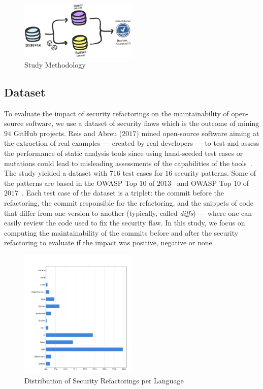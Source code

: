 \documentclass[10pt,conference]{IEEEtran}
\begin{document}
%
\begin{figure}[h]
 	\centering 	\includegraphics[width=0.5\textwidth]{figures/methodology.pdf}
 	\caption{Study Methodology}
	\label{fig:met}
\end{figure}
%
\subsection{Dataset}
%
To evaluate the impact of security refactorings on the maintainability of
open-source software, we use a dataset of security flaws which is the outcome of
mining $94$ GitHub projects. Reis and Abreu ($2017$) mined open-source
software aiming at the extraction of real examples --- created by real
developers --- to test and assess the performance of static analysis tools since
using hand-seeded test cases or mutations could lead to misleading assessments
of the capabilities of the tools~\cite{just2014mutants}. The study yielded a
dataset with $716$ test cases for $16$ security patterns. Some of the patterns
are based in the OWASP Top $10$ of $2013$~\cite{oswap:2013} and OWASP Top $10$ of
$2017$~\cite{oswap:2017}. Each test case of the
dataset is a triplet: the commit before the refactoring, the commit responsible
for the refactoring, and the snippets of code that differ from one version to
another (typically, called \textit{diffs}) --- where one can easily review the
code used to fix the security flaw. In this study, we focus on computing the
maintainability of the commits before and after the security refactoring to
evaluate if the impact was positive, negative or none.

\begin{figure}[h]
 	\centering 	\includegraphics[width=0.5\textwidth]{figures/language_dist.pdf}
 	\caption{Distribution of Security Refactorings per Language}
	\label{fig:lang}
\end{figure}
\end{document}
